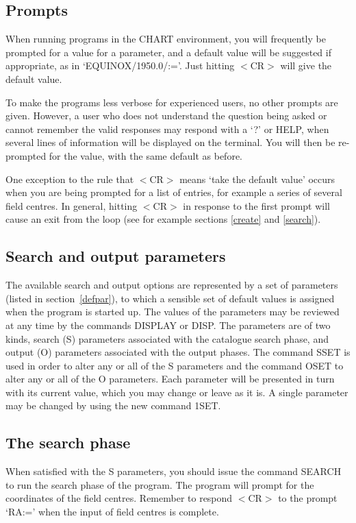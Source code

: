 \documentclass{article}
\begin{document}
\subsection{Prompts}
When running programs in the CHART environment, you will frequently be prompted
for a value for a parameter, and a default value will be suggested if
appropriate, as in `EQUINOX/1950.0/:='.
Just hitting $<$CR$>$ will give the default value.

To make the programs less verbose for experienced users, no other prompts are
given.
However, a user who does not understand the question being asked or cannot
remember the valid responses may respond with a `?' or HELP, when several lines
of information will be displayed on the terminal.
You will then be re-prompted for the value, with the same default as before.

One exception to the rule that $<$CR$>$ means `take the default value' occurs
when you are being prompted for a list of entries, for example a series of
several field centres. In general, hitting $<$CR$>$ in response to the first
prompt will cause an exit from the loop (see for example sections \ref{create}
and \ref{search}). 

\subsection{Search and output parameters}
The available search and output options are represented by a set of parameters
(listed in section~\ref{defpar}), to which a sensible set of default values 
is assigned when the program is started up.
The values of the parameters may be reviewed at any time by the commands DISPLAY
or DISP.
The parameters are of two kinds, search (S) parameters associated with the
catalogue search phase, and output (O) parameters associated with the output
phases.
The command SSET is used in order to alter any or all of the S parameters and
the command OSET to alter any or all of the O parameters.
Each parameter will be presented in turn with its current value, which you may
change or leave as it is.
A single parameter may be changed by using the new command 1SET.
\subsection{The search phase}
When satisfied with the S parameters, you should issue the command SEARCH to run
the search phase of the program.
The program will prompt for the coordinates of the field centres.
Remember to respond $<$CR$>$ to the prompt `RA:=' when the input of field
centres is complete. 
\end{document}
